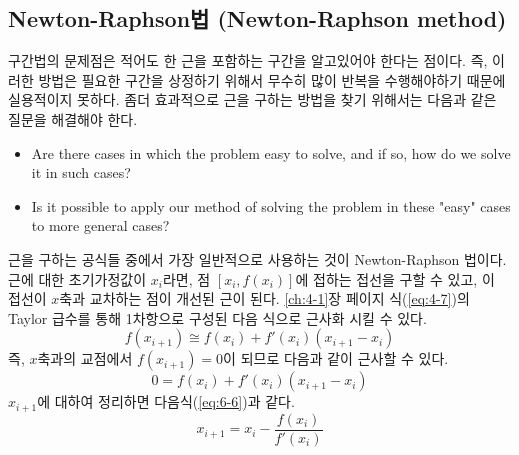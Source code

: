 \subsection{Newton-Raphson법 (Newton-Raphson method)}
구간법의 문제점은 적어도 한 근을 포함하는 구간을 알고있어야 한다는 점이다. 즉, 이러한 방법은 필요한 구간을 상정하기 위해서 무수히 많이 반복을 수행해야하기 때문에 실용적이지 못하다. 좀더 효과적으로 근을 구하는 방법을 찾기 위해서는 다음과 같은 질문을 해결해야 한다.
\begin{itemize}
\item Are there cases in which the problem easy to solve, and if so, how do we solve it in such cases?
\item Is it possible to apply our method of solving the problem in these "easy" cases to more general cases?
\end{itemize}
근을 구하는 공식들 중에서 가장 일반적으로 사용하는 것이 Newton-Raphson 법이다. 근에 대한 초기가정값이 $x_{i}$라면, 점 $[x_{i},f(x_{i})]$에 접하는 접선을 구할 수 있고, 이 접선이 $x$축과 교차하는 점이 개선된 근이 된다.
\ref{ch:4-1}장 \pageref{eq:4-7}페이지 식(\ref{eq:4-7})의 Taylor 급수를 통해 1차항으로 구성된 다음 식으로 근사화 시킬 수 있다.
\begin{equation}
f(x_{i+1})\cong f(x_{i})+f'(x_{i})(x_{i+1}-x_{i})
\end{equation}
즉, $x$축과의 교점에서 $f(x_{i+1})=0$이 되므로 다음과 같이 근사할 수 있다.
\begin{equation}
0=f(x_{i})+f'(x_{i})(x_{i+1}-x_{i})
\end{equation}
$x_{i+1}$에 대하여 정리하면 다음식(\ref{eq:6-6})과 같다.
\begin{equation}\label{eq:6-6}
x_{i+1}=x_{i}-\frac{f(x_{i})}{f'(x_{i})}
\end{equation}

